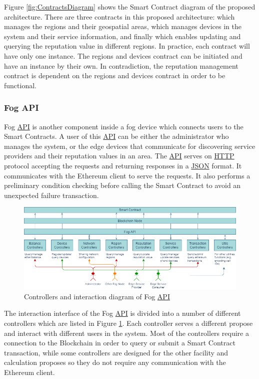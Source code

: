 \npara Figure \ref{fig:ContractsDiagram} shows the Smart Contract diagram of the proposed architecture.
There are three contracts in this proposed architecture:
   which manages the regions and their geospatial areas,
   which manages devices in the system and their service information,
  and finally  which enables updating and querying the reputation value in different regions.
In practice, each contract will have only one instance.
The regions and devices contract can be initiated and have an instance by their own.
In contradiction, the reputation management contract is dependent on the regions and devices contract in order to be functional.

\subsubsection{Fog API}

\npara Fog \hyperref[Acronym-API]{API} is another component inside a fog device which connects users to the Smart Contracts.
A user of this \hyperref[Acronym-API]{API} can be either the administrator who manages the system, or the edge devices that communicate for discovering service providers and their reputation values in an area.
The \hyperref[Acronym-API]{API} serves on \hyperref[Acronym-HTTP]{HTTP} protocol accepting the requests and returning responses in a \hyperref[Acronym-JSON]{JSON} format.
It communicates with the Ethereum client to serve the requests.
It also performs a preliminary condition checking before calling the Smart Contract to avoid an unexpected failure transaction.

\begin{figure}[ht]
  \centering
  \includegraphics[width=\textwidth]{images/FogAPIs.png}
  \caption{Controllers and interaction diagram of Fog \hyperref[Acronym-API]{API}}
  \label{fig:FogAPIs}
\end{figure}

\npara The interaction interface of the Fog \hyperref[Acronym-API]{API} is divided into a number of different controllers which are listed in Figure \ref{fig:FogAPIs}.
Each controller serves a different propose and interact with different users in the system.
Most of the controllers require a connection to the Blockchain in order to query or submit a Smart Contract transaction, while some controllers are designed for the other facility and calculation proposes so they do not require any communication with the Ethereum client.


